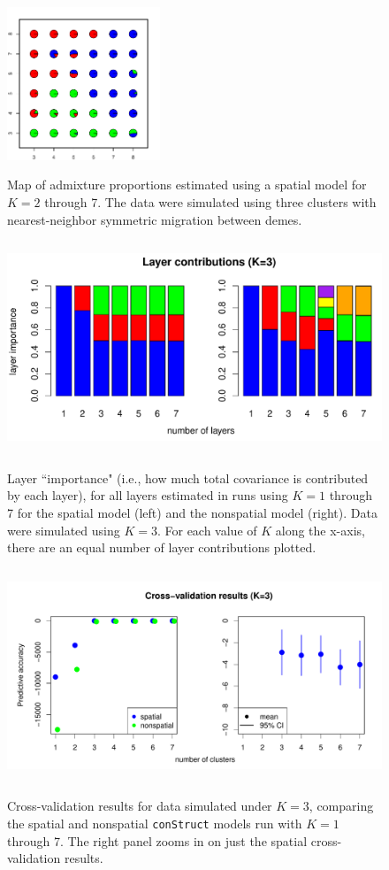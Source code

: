 \documentclass[12pt]{article}
\begin{document}
\begin{figure}
			{\includegraphics[width=1.8in,height=1.8in]{figs/sims/simK3_sp_pies_K7.pdf}}
	\caption{
	Map of admixture proportions estimated using a spatial model for $K=2$ through 7.
	The data were simulated using three clusters with nearest-neighbor symmetric migration between demes.
    }\label{simK3_sp_pies}
\end{figure}
\clearpage

\begin{figure}
	\centering
		{\includegraphics[width=5in,height=2.5in]{figs/sims/simK3_laycon_barplots.pdf}}
		\caption{
			Layer ``importance" (i.e., how much total covariance is contributed by each layer), 
			for all layers estimated in runs using $K = 1$ through 7 
			for the spatial model (left) and the nonspatial model (right).
			Data were simulated using $K=3$.
			For each value of $K$ along the x-axis, there are an equal number of layer contributions plotted.
		}\label{simK3_laycon}
\end{figure}

\begin{figure}
	\centering
		{\includegraphics[width=5in,height=2.5in]{figs/sims/simK3_std_xval.pdf}}
		\caption{
			Cross-validation results for data simulated under $K=3$,
			comparing the spatial and nonspatial \texttt{conStruct} models run with $K=1$ through 7.  
			The right panel zooms in on just the spatial cross-validation results.
		}\label{simK3_xval}
\end{figure}
\end{document}
